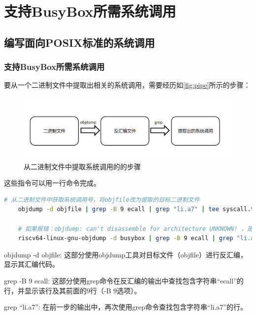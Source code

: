 \section{支持BusyBox所需系统调用}
\subsection{编写面向POSIX标准的系统调用}
\subsubsection{支持BusyBox所需系统调用}

要从一个二进制文件中提取出相关的系统调用，需要经历如\ref{fig:pipe}所示的步骤：

\begin{figure}[htb]
    \centering
    \includegraphics[width=\textwidth]{figures/09-03-系统调用抽取}
    \caption{
        从二进制文件中提取系统调用的的步骤
    }
    \label{fig:get_syscall}
\end{figure}

这些指令可以用一行命令完成。

\begin{lstlisting}[language=bash]
    # 从二进制文件中获取系统调用号，将objfile改为提取的目标二进制文件
    objdump -d objfile | grep -B 9 ecall | grep "li.a7" | tee syscall.txt

    # 如果报错：objdump: can't disassemble for architecture UNKNOWN! ，是由于当前的objdump并非RISC-V架构，尝试
    riscv64-linux-gnu-objdump -d busybox | grep -B 9 ecall | grep "li.a7" | tee syscall.txt

\end{lstlisting}

objdump -d objfile: 这部分使用objdump工具对目标文件（objfile）进行反汇编，显示其汇编代码。

grep -B 9 ecall: 这部分使用grep命令在反汇编的输出中查找包含字符串\enquote{ecall}的行，并显示该行及其前面的9行（-B 9选项）。

grep \enquote{li.a7}: 在前一步的输出中，再次使用grep命令查找包含字符串\enquote{li.a7}的行。


